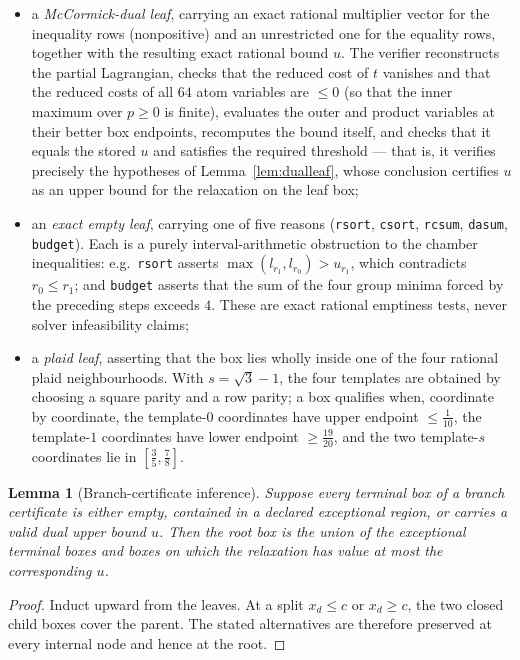 \documentclass[11pt]{amsart}
\newtheorem{lemma}[theorem]{Lemma}
\theoremstyle{definition}
\theoremstyle{remark}
\begin{document}
\begin{itemize}
\item a \emph{McCormick-dual leaf}, carrying an exact rational multiplier vector for the inequality rows (nonpositive) and an unrestricted one for the equality rows, together with the resulting exact rational bound $u$. The verifier reconstructs the partial Lagrangian, checks that the reduced cost of $t$ vanishes and that the reduced costs of all $64$ atom variables are $\le0$ (so that the inner maximum over $p\ge0$ is finite), evaluates the outer and product variables at their better box endpoints, recomputes the bound itself, and checks that it equals the stored $u$ and satisfies the required threshold --- that is, it verifies precisely the hypotheses of Lemma~\ref{lem:dualleaf}, whose conclusion certifies $u$ as an upper bound for the relaxation on the leaf box;
\item an \emph{exact empty leaf}, carrying one of five reasons (\texttt{rsort}, \texttt{csort}, \texttt{rcsum}, \texttt{dasum}, \texttt{budget}). Each is a purely interval-arithmetic obstruction to the chamber inequalities: e.g.\ \texttt{rsort} asserts $\max(l_{r_1},l_{r_0})>u_{r_1}$, which contradicts $r_0\le r_1$; and \texttt{budget} asserts that the sum of the four group minima forced by the preceding steps exceeds $4$. These are exact rational emptiness tests, never solver infeasibility claims;
\item a \emph{plaid leaf}, asserting that the box lies wholly inside one of the four rational plaid neighbourhoods. With $s=\sqrt3-1$, the four templates are obtained by choosing a square parity and a row parity; a box qualifies when, coordinate by coordinate, the template-$0$ coordinates have upper endpoint $\le\frac1{10}$, the template-$1$ coordinates have lower endpoint $\ge\frac{19}{20}$, and the two template-$s$ coordinates lie in $[\frac35,\frac78]$.
\end{itemize}

\begin{lemma}[Branch-certificate inference]\label{lem:branchsound}
Suppose every terminal box of a branch certificate is either empty, contained
in a declared exceptional region, or carries a valid dual upper bound $u$.
Then the root box is the union of the exceptional terminal boxes and boxes
on which the relaxation has value at most the corresponding $u$.
\end{lemma}

\begin{proof}
Induct upward from the leaves.  At a split $x_d\le c$ or $x_d\ge c$, the two
closed child boxes cover the parent.  The stated alternatives are therefore
preserved at every internal node and hence at the root.
\end{proof}
\end{document}
